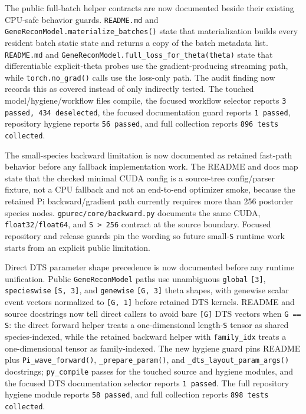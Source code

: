 \documentclass[11pt]{article}
\begin{document}
The public full-batch helper contracts are now documented beside their existing
CPU-safe behavior guards.  \texttt{README.md} and
\texttt{GeneReconModel.materialize\_batches()} state that materialization builds
every resident batch static state and returns a copy of the batch metadata list.
\texttt{README.md} and \texttt{GeneReconModel.full\_loss\_for\_theta(theta)}
state that differentiable explicit-theta probes use the gradient-producing
streaming path, while \texttt{torch.no\_grad()} calls use the loss-only path.
The audit finding now records this as covered instead of only indirectly
tested.  The touched model/hygiene/workflow files compile, the focused workflow
selector reports \texttt{3 passed, 434 deselected}, the focused documentation
guard reports \texttt{1 passed}, repository hygiene reports \texttt{56 passed},
and full collection reports \texttt{896 tests collected}.

The small-species backward limitation is now documented as retained fast-path
behavior before any fallback implementation work.  The README and docs map
state that the checked minimal CUDA config is a source-tree config/parser
fixture, not a CPU fallback and not an end-to-end optimizer smoke, because the
retained Pi backward/gradient path currently requires more than 256 postorder
species nodes.  \texttt{gpurec/core/backward.py} documents the same CUDA,
\texttt{float32}/\texttt{float64}, and \texttt{S > 256} contract at the source
boundary.  Focused repository and release guards pin the wording so future
small-\texttt{S} runtime work starts from an explicit public limitation.

Direct DTS parameter shape precedence is now documented before any runtime
unification.  Public \texttt{GeneReconModel} paths use unambiguous
\texttt{global} \texttt{[3]}, \texttt{specieswise} \texttt{[S, 3]}, and
\texttt{genewise} \texttt{[G, 3]} theta shapes, with genewise scalar event
vectors normalized to \texttt{[G, 1]} before retained DTS kernels.  README and
source docstrings now tell direct callers to avoid bare \texttt{[G]} DTS
vectors when \texttt{G == S}: the direct forward helper treats a
one-dimensional length-\texttt{S} tensor as shared species-indexed, while the
retained backward helper with \texttt{family\_idx} treats a one-dimensional
tensor as family-indexed.  The new hygiene guard pins README plus
\texttt{Pi\_wave\_forward()}, \texttt{\_prepare\_param()}, and
\texttt{\_dts\_layout\_param\_args()} docstrings; \texttt{py\_compile} passes
for the touched source and hygiene modules, and the focused DTS documentation
selector reports \texttt{1 passed}.  The full repository hygiene module reports
\texttt{58 passed}, and full collection reports \texttt{898 tests collected}.
\end{document}
